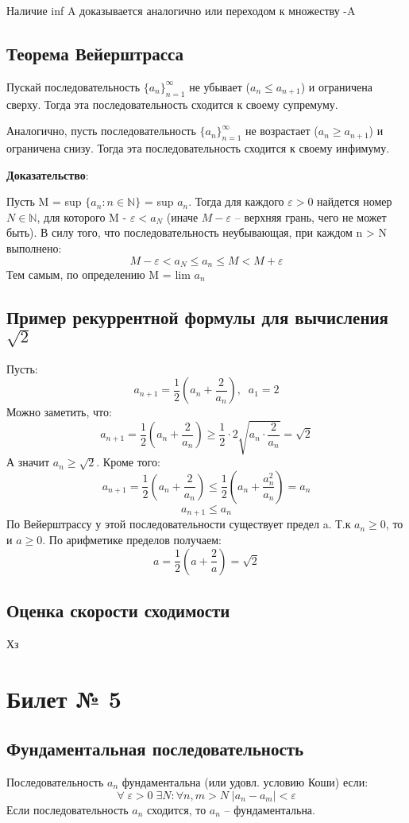 \documentclass[a4paper,12pt]{article}
\begin{document}
Наличие inf A доказывается аналогично или переходом к множеству -A

\subsection*{Теорема Вейерштрасса}
Пускай последовательность $\{a_n\}_{n=1}^{\infty}$ не убывает ($a_n \leq a_{n+1}$) и ограничена сверху. Тогда эта последовательность сходится к своему супремуму.

Аналогично, пусть последовательность $\{a_n\}_{n=1}^{\infty}$ не возрастает ($a_n \geq a_{n+1}$) и ограничена снизу. Тогда эта последовательность сходится к своему инфимуму.

\textbf{Доказательство}:

Пусть M = sup $\{a_n : n \in \mathbb{N} \}$ = sup $a_n$. Тогда для каждого $\varepsilon > 0$ найдется номер $N \in \mathbb{N} $, для которого M - $\varepsilon < a_N$ (иначе $M - \varepsilon$ -- верхняя грань, чего не может быть). В силу того, что последовательность неубывающая, при каждом n > N выполнено:
\[
M - \varepsilon < a_N \leq a_n \leq M < M + \varepsilon
\]
Тем самым, по определению M = lim $a_n$
\subsection*{Пример рекуррентной формулы для вычисления $\sqrt{2}$}
Пусть:
\[
a_{n+1} = \frac{1}{2}\left(a_n + \frac{2}{a_n}\right), \; \; a_1 = 2
\]
Можно заметить, что:
\[
a_{n+1} = \frac{1}{2}\left(a_n + \frac{2}{a_n}\right) \geq \frac{1}{2} \cdot 2\sqrt{a_n \cdot \frac{2}{a_n}} = \sqrt{2}
\]
А значит $a_n \geq \sqrt{2}$. Кроме того:
\[
a_{n+1} =  \frac{1}{2}\left(a_n + \frac{2}{a_n}\right) \leq \frac{1}{2}\left(a_n + \frac{a_n^2}{a_n}\right) = a_n
\]
\[
a_{n+1} \leq a_n
\]
По Вейерштрассу у этой последовательности существует предел a. Т.к $a_n \geq 0$, то и $a \geq 0$. По арифметике пределов получаем:
\[
a = \frac{1}{2} \left(a + \frac{2}{a}\right) = \sqrt{2}
\]
\subsection*{Оценка скорости сходимости}
Хз

\newpage
\section*{Билет № 5}
\subsection*{Фундаментальная последовательность}
Последовательность $a_n$ фундаментальна (или удовл. условию Коши) если:
\[
\forall \; \varepsilon > 0 \; \exists  N : \forall n, m > N \; |a_n - a_m| < \varepsilon
\]
Если последовательность $a_n$ сходится, то  $a_n$  -- фундаментальна.
\end{document}
